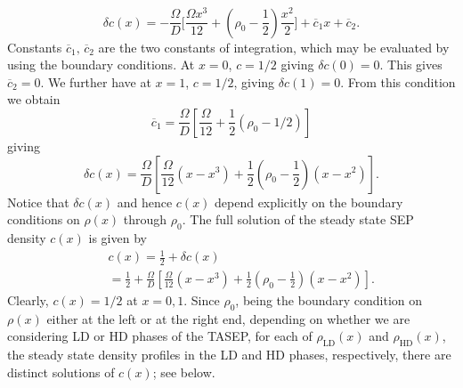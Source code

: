\documentclass[aps,pre,twocolumn,superscriptaddress,amsmath,amssymb,longbibliography,floatfix]{revtex4}
\begin{document}
{\begin{equation}
  \delta c(x)=  -\frac{\Omega}{D}\bigg[\frac{\Omega x^3}{12} + (\rho_0-\frac{1}{2})\frac{x^2}{2}\bigg] + \overline c_1x + \overline c_2.
\end{equation}
 Constants $\overline c_1,\,\overline c_2$ are the two constants of integration, which may be evaluated by using the boundary conditions. At $x=0$, $c=1/2$ giving $\delta c(0)=0$. This gives $\overline c_2=0$. We further have at $x=1$, $c=1/2$, giving $\delta c(1)=0$. From this condition we obtain
 \begin{equation}
  \overline c_1=\frac{\Omega}{D}\left[\frac{\Omega}{12}+\frac{1}{2}(\rho_0-1/2)\right]
 \end{equation}
giving
\begin{equation}
 \delta c(x)=\frac{\Omega}{D}\left[\frac{\Omega}{12}(x-x^3)+\frac{1}{2}(\rho_0-\frac{1}{2})(x-x^2)\right].
\end{equation}
Notice that $\delta c(x)$ and hence $c(x)$ depend explicitly on the boundary conditions on $\rho(x)$ through $\rho_0$.
The full solution of the steady state SEP density $c(x)$ is given by
\begin{eqnarray}
 &&c(x)=\frac{1}{2} + \delta c(x)\nonumber \\
 &&=\frac{1}{2} +\frac{\Omega}{D}\left[\frac{\Omega}{12}(x-x^3)+\frac{1}{2}(\rho_0-\frac{1}{2})(x-x^2)\right].\label{full-c-large-D}
\end{eqnarray}
Clearly, $c(x)=1/2$ at $x=0,1$.
Since $\rho_0$, being the boundary condition on $\rho(x)$ either at the left or at the right end, depending on whether we are considering LD or HD phases of the TASEP,  for each of $\rho_\text{LD}(x)$ and $\rho_\text{HD}(x)$, the steady state density profiles in the LD and HD phases, respectively, there are distinct solutions of $c(x)$; see below.

}
\end{document}

